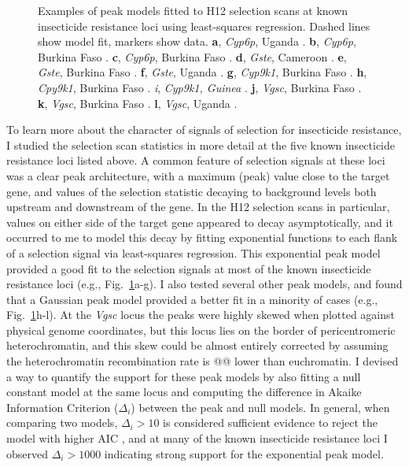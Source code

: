 \documentclass[a4paper,11pt,abstracton,hidelinks]{scrartcl}
\begin{document}
\begin{figure}[t!]
\begin{subfigure}[t]{0.32\textwidth}
    \end{subfigure}
    \caption{Examples of peak models fitted to H12 selection scans at known insecticide resistance loci using least-squares regression. Dashed lines show model fit, markers show data. \textbf{a}, \textit{Cyp6p}, Uganda \agam. \textbf{b}, \textit{Cyp6p}, Burkina Faso \agam. \textbf{c}, \textit{Cyp6p}, Burkina Faso \acol. \textbf{d}, \textit{Gste}, Cameroon \agam. \textbf{e}, \textit{Gste}, Burkina Faso \agam. \textbf{f}, \textit{Gste}, Uganda \agam. \textbf{g}, \textit{Cyp9k1}, Burkina Faso \agam. \textbf{h}, \textit{Cpy9k1}, Burkina Faso \acol. \textit{i}, \textit{Cyp9k1, Guinea \agam}. \textbf{j}, \textit{Vgsc}, Burkina Faso \acol. \textbf{k}, \textit{Vgsc}, Burkina Faso \agam. \textbf{l}, \textit{Vgsc}, Uganda \agam.}
    \label{fig:peak_fits}
\end{figure}


To learn more about the character of signals of selection for insecticide resistance, I studied the selection scan statistics in more detail at the five known insecticide resistance loci listed above.
%
A common feature of selection signals at these loci was a clear peak architecture, with a maximum (peak) value close to the target gene, and values of the selection statistic decaying to background levels both upstream and downstream of the gene.
%
In the H12 selection scans in particular, values on either side of the target gene appeared to decay asymptotically, and it occurred to me to model this decay by fitting exponential functions to each flank of a selection signal via least-squares regression.
%
This exponential peak model provided a good fit to the selection signals at most of the known insecticide resistance loci (e.g., Fig.~\ref{fig:peak_fits}a-g).
%
I also tested several other peak models, and found that a Gaussian peak model provided a better fit in a minority of cases (e.g., Fig.~\ref{fig:peak_fits}h-l).
%
At the \textit{Vgsc} locus the peaks were highly skewed when plotted against physical genome coordinates, but this locus lies on the border of pericentromeric heterochromatin, and this skew could be almost entirely corrected by assuming the heterochromatin recombination rate is @@ lower than euchromatin.
%
I devised a way to quantify the support for these peak models by also fitting a null constant model at the same locus and computing the difference in Akaike Information Criterion ($\Delta_i$) between the peak and null models.
%
In general, when comparing two models, $\Delta_i > 10$ is considered sufficient evidence to reject the model with higher AIC \parencite{Burnham2002}, and at many of the known insecticide resistance loci I observed $\Delta_i > 1000$ indicating strong support for the exponential peak model.
%
\end{document}
